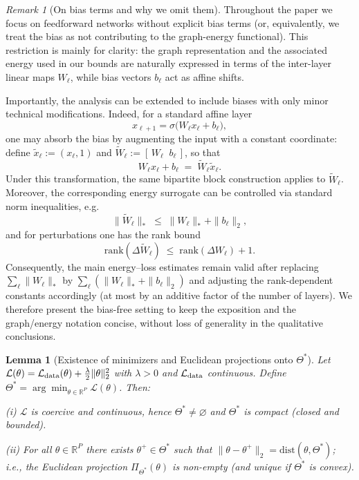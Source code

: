 \documentclass[a4paper,fleqn]{cas-sc}
\newtheorem{lemma}[theorem]{Lemma}
\theoremstyle{remark}
\newtheorem{remark}{Remark}
\theoremstyle{definition}
\begin{document}
\begin{remark}[On bias terms and why we omit them]\label{rem:bias}
Throughout the paper we focus on feedforward networks without explicit bias terms (or, equivalently, we treat the bias as not contributing to the graph-energy functional).
This restriction is mainly for clarity: the graph representation and the associated energy used in our bounds are naturally expressed in terms of the inter-layer linear maps $W_\ell$, while bias vectors $b_\ell$ act as affine shifts.

Importantly, the analysis can be extended to include biases with only minor technical modifications.
Indeed, for a standard affine layer
\[
x_{\ell+1}=\sigma\!\bigl(W_\ell x_\ell + b_\ell\bigr),
\]
one may absorb the bias by augmenting the input with a constant coordinate:
define $\tilde x_\ell := (x_\ell,1)$ and $\tilde W_\ell := [\,W_\ell\;\; b_\ell\,]$, so that
\[
W_\ell x_\ell + b_\ell \;=\; \tilde W_\ell \tilde x_\ell.
\]
Under this transformation, the same bipartite block construction applies to $\tilde W_\ell$.
Moreover, the corresponding energy surrogate can be controlled via standard norm inequalities, e.g.
\[
\|\tilde W_\ell\|_* \;\le\; \|W_\ell\|_* + \|b_\ell\|_2,
\]
and for perturbations one has the rank bound
\[
\mathrm{rank}(\Delta \tilde W_\ell)\;\le\;\mathrm{rank}(\Delta W_\ell)+1.
\]
Consequently, the main energy--loss estimates remain valid after replacing
$\sum_\ell \|W_\ell\|_*$ by $\sum_\ell(\|W_\ell\|_*+\|b_\ell\|_2)$ and adjusting the rank-dependent constants accordingly (at most by an additive factor of the number of layers).
We therefore present the bias-free setting to keep the exposition and the graph/energy notation concise, without loss of generality in the qualitative conclusions.
\end{remark}


\begin{lemma}[Existence of minimizers and Euclidean projections onto $\Theta^*$]\label{lem:proj-exists}
Let $\mathcal{L}(\theta)=\mathcal{L}_{\rm data}(\theta)+\tfrac{\lambda}{2}\|\theta\|_2^2$ with $\lambda>0$ and $\mathcal{L}_{\rm data}$ continuous.
Define $\Theta^*=\arg\min_{\theta\in\mathbb{R}^P}\mathcal{L}(\theta)$. Then:
\par\noindent\textup{(i)} $\mathcal{L}$ is coercive and continuous, hence $\Theta^*\neq\varnothing$ and $\Theta^*$ is compact (closed and bounded).\par\smallskip
\noindent\textup{(ii)} For all $\theta\in\mathbb{R}^P$ there exists $\theta^+\in\Theta^*$ such that $\|\theta-\theta^+\|_2=\mathrm{dist}(\theta,\Theta^*)$; i.e., the Euclidean projection $\Pi_{\Theta^*}(\theta)$ is non-empty (and unique if $\Theta^*$ is convex).
\end{lemma}
\end{document}
